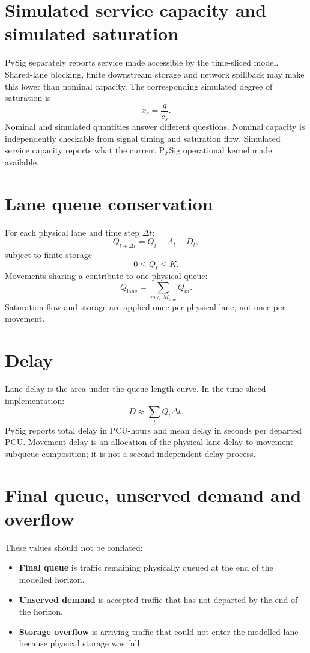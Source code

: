 \section{Simulated service capacity and simulated saturation}
PySig separately reports service made accessible by the time-sliced model. Shared-lane blocking, finite downstream storage and network spillback may make this lower than nominal capacity. The corresponding simulated degree of saturation is
\begin{equation}
x_s=\frac{q}{c_s}.
\end{equation}
Nominal and simulated quantities answer different questions. Nominal capacity is independently checkable from signal timing and saturation flow. Simulated service capacity reports what the current PySig operational kernel made available.

\section{Lane queue conservation}
For each physical lane and time step $\Delta t$:
\begin{equation}
Q_{t+\Delta t}=Q_t+A_t-D_t,
\end{equation}
subject to finite storage
\begin{equation}
0\leq Q_t\leq K.
\end{equation}
Movements sharing a  contribute to one physical queue:
\begin{equation}
Q_{\mathrm{lane}}=\sum_{m\in M_{\mathrm{lane}}}Q_m.
\end{equation}
Saturation flow and storage are applied once per physical lane, not once per movement.

\section{Delay}
Lane delay is the area under the queue-length curve. In the time-sliced implementation:
\begin{equation}
D\approx\sum_t Q_t\Delta t.
\end{equation}
PySig reports total delay in PCU-hours and mean delay in seconds per departed PCU. Movement delay is an allocation of the physical lane delay to movement subqueue composition; it is not a second independent delay process.

\section{Final queue, unserved demand and overflow}
These values should not be conflated:
\begin{itemize}
\item \textbf{Final queue} is traffic remaining physically queued at the end of the modelled horizon.
\item \textbf{Unserved demand} is accepted traffic that has not departed by the end of the horizon.
\item \textbf{Storage overflow} is arriving traffic that could not enter the modelled lane because physical storage was full.
\end{itemize}

